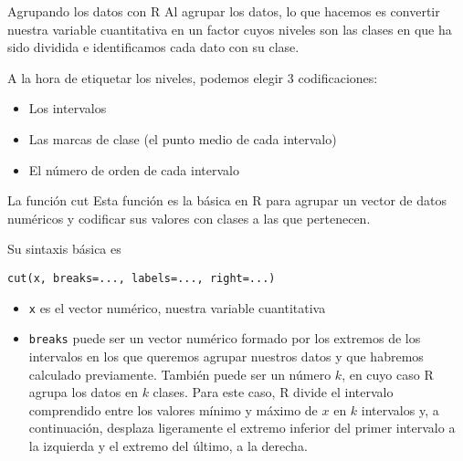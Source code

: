 \documentclass[
  ignorenonframetext,
]{beamer}
\providecommand{\tightlist}{%
  \setlength{\itemsep}{0pt}\setlength{\parskip}{0pt}}
\begin{document}
\begin{frame}{Agrupando los datos con R}
\protect\hypertarget{agrupando-los-datos-con-r}{}
Al agrupar los datos, lo que hacemos es convertir nuestra variable
cuantitativa en un factor cuyos niveles son las clases en que ha sido
dividida e identificamos cada dato con su clase.

A la hora de etiquetar los niveles, podemos elegir 3 codificaciones:

\begin{itemize}
\tightlist
\item
  Los intervalos
\item
  Las marcas de clase (el punto medio de cada intervalo)
\item
  El número de orden de cada intervalo
\end{itemize}
\end{frame}

\begin{frame}[fragile]{La función cut}
\protect\hypertarget{la-funciuxf3n-cut}{}
Esta función es la básica en R para agrupar un vector de datos numéricos
y codificar sus valores con clases a las que pertenecen.

Su sintaxis básica es

\texttt{cut(x,\ breaks=...,\ labels=...,\ right=...)}

\begin{itemize}
\tightlist
\item
  \texttt{x} es el vector numérico, nuestra variable cuantitativa
\item
  \texttt{breaks} puede ser un vector numérico formado por los extremos
  de los intervalos en los que queremos agrupar nuestros datos y que
  habremos calculado previamente. También puede ser un número \(k\), en
  cuyo caso R agrupa los datos en \(k\) clases. Para este caso, R divide
  el intervalo comprendido entre los valores mínimo y máximo de \(x\) en
  \(k\) intervalos y, a continuación, desplaza ligeramente el extremo
  inferior del primer intervalo a la izquierda y el extremo del último,
  a la derecha.
\end{itemize}
\end{frame}
\end{document}
